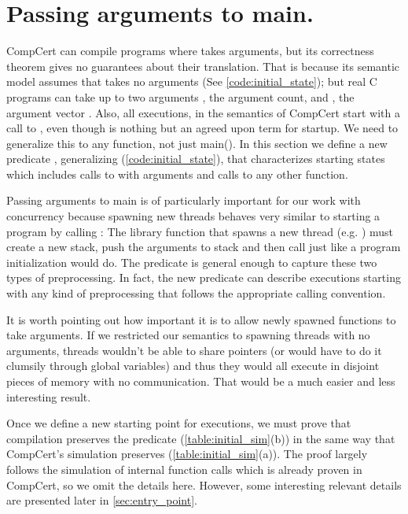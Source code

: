 \section{Passing arguments to main.}\label{sec:premain}

CompCert can compile programs where  takes arguments, but its correctness theorem gives no guarantees about their translation. That is because its semantic model assumes that  takes no arguments (See \autoref{code:initial_state}); but real C programs can take up to two arguments , the argument count, and , the argument vector %
. Also, all executions, in the semantics of CompCert start with a call to , even though  is nothing but an agreed upon term for startup. We need to generalize this to any function, not just main(). In this section we define a new predicate , generalizing  (\autoref{code:initial_state}), that characterizes starting states which includes calls to  with arguments and calls to any other function.

Passing arguments to main is of particularly important for our work with concurrency because spawning new threads behaves very similar to starting a program by calling : The library function that spawns a new thread (e.g. ) must create a new stack, push the arguments to stack and then call  just like a program initialization would do. The predicate  is general enough to capture these two types of preprocessing. In fact, the new predicate can describe executions starting with any kind of preprocessing that follows the appropriate calling convention.

It is worth pointing out how important it is to allow newly spawned functions to take arguments. If we restricted our semantics to spawning threads with no arguments, threads wouldn't be able to share pointers (or would have to do it clumsily through global variables) and thus they would all execute in disjoint pieces of memory with no communication. That would be a much easier and less interesting result. 

Once we define a new starting point for executions, we must prove that compilation preserves the predicate  (\autoref{table:initial_sim}(b)) in the same way that CompCert's simulation preserves  (\autoref{table:initial_sim}(a)). The proof largely follows the simulation of internal function calls which is already proven in CompCert, so we omit the details here. However, some interesting relevant details are presented later in \autoref{sec:entry_point}.

